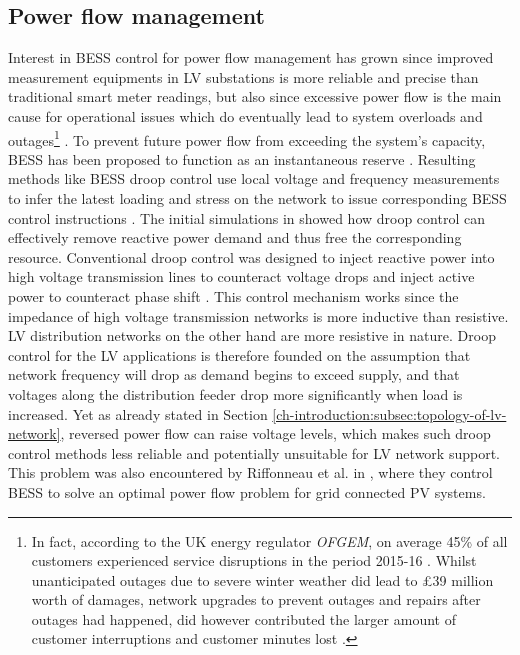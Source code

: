 \subsection{Power flow management}
\label{ch-literature:subsec:power-flow-management}

Interest in BESS control for power flow management has grown since improved measurement equipments in LV substations is more reliable and precise than traditional smart meter readings, but also since excessive power flow is the main cause for operational issues which do eventually lead to system overloads and outages\footnote{
In fact, according to the UK energy regulator \textit{OFGEM}, on average 45\% of all customers experienced service disruptions in the period 2015-16 \cite{Ofgem2017}.
Whilst unanticipated outages due to severe winter weather did lead to \pounds39 million worth of damages, network upgrades to prevent outages and repairs after outages had happened, did however contributed the larger amount of customer interruptions and customer minutes lost \cite{Ofgem2014}.
} \cite{Putrus2009, Pillai2010}.
To prevent future power flow from exceeding the system's capacity, BESS has been proposed to function as an instantaneous reserve \cite{Kunisch1986a, Kunisch1986}.
Resulting methods like BESS droop control use local voltage and frequency measurements to infer the latest loading and stress on the network to issue corresponding BESS control instructions \cite{Engler2005a}.
The initial simulations in \cite{Engler2005a} showed how droop control can effectively remove reactive power demand and thus free the corresponding resource. 
Conventional droop control was designed to inject reactive power into high voltage transmission lines to counteract voltage drops and inject active power to counteract phase shift \cite{Tayab2017}.
This control mechanism works since the impedance of high voltage transmission networks is more inductive than resistive.
LV distribution networks on the other hand are more resistive in nature.
Droop control for the LV applications is therefore founded on the assumption that network frequency will drop as demand begins to exceed supply, and that voltages along the distribution feeder drop more significantly when load is increased.
Yet as already stated in Section \ref{ch-introduction:subsec:topology-of-lv-network}, reversed power flow can raise voltage levels, which makes such droop control methods less reliable and potentially unsuitable for LV network support.
This problem was also encountered by Riffonneau et al. in \cite{Riffonneau2011}, where they control BESS to solve an optimal power flow problem for grid connected PV systems.
